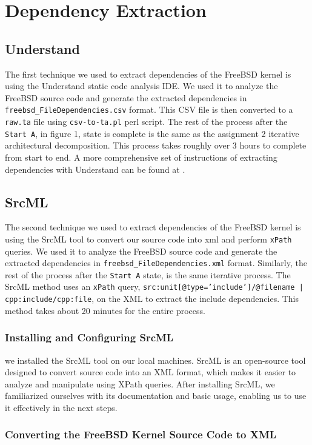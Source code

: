 \documentclass[12pt, dvipsnames, a4paper]{article}
\newcommand{\code}[1]{\texttt{#1}}
\begin{document}
\section{Dependency Extraction}
\subsection{Understand}
The first technique we used to extract dependencies of the FreeBSD kernel is using the Understand static code analysis IDE. We used it to analyze the FreeBSD source code and generate the extracted dependencies in \code{freebsd\_FileDependencies.csv} format. This CSV file is then converted to a \code{raw.ta} file using \code{csv-to-ta.pl} perl script. The rest of the process after the \code{Start A}, in figure 1, state is complete is the same as the assignment 2 iterative architectural decomposition. This process takes roughly over 3 hours to complete from start to end. A more comprehensive set of instructions of extracting dependencies with Understand can be found at \cite{understand}.


\subsection{SrcML}
The second technique we used to extract dependencies of the FreeBSD kernel is using the SrcML tool to convert our source code into xml and perform \code{xPath} queries. We used it to analyze the FreeBSD source code and generate the extracted dependencies in \code{freebsd\_FileDependencies.xml} format. Similarly, the rest of the process after the \code{Start A} state, is the same iterative process. The SrcML method uses an \code{xPath} query, \code{src:unit[@type='include']/@filename | cpp:include/cpp:file}, on the XML to extract the include dependencies. This method takes about 20 minutes for the entire process.

\subsubsection{Installing and Configuring SrcML}

we installed the SrcML tool on our local machines. SrcML is an open-source tool designed to convert source code into an XML format, which makes it easier to analyze and manipulate using XPath queries. After installing SrcML, we familiarized ourselves with its documentation and basic usage, enabling us to use it effectively in the next steps.

\subsubsection{Converting the FreeBSD Kernel Source Code to XML}
\end{document}

